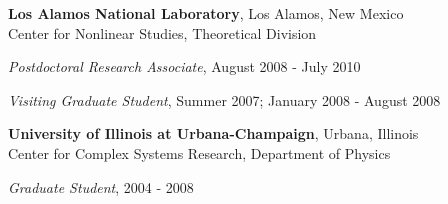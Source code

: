{\bf Los Alamos National Laboratory}, Los Alamos, New Mexico\\
Center for Nonlinear Studies, Theoretical Division
\begin{list1}
\item[] {\em Postdoctoral Research Associate}, August 2008 - July 2010
\item[] {\em Visiting Graduate Student}, Summer 2007; January 2008 - August 2008
\end{list1}

{\bf University of Illinois at Urbana-Champaign}, Urbana, Illinois\\
Center for Complex Systems Research, Department of Physics
\begin{list1}
\item[] {\em Graduate Student}, 2004 - 2008
\end{list1}

